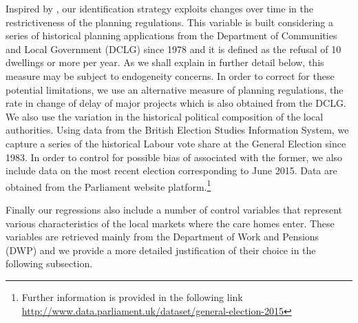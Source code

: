 \documentclass[12pt,letterpaper]{article}
\begin{document}
    Inspired by \citet{hilber2016supply}, our identification strategy exploits changes over time in the restrictiveness of the 
planning regulations. This variable is built considering a series of historical
  planning applications from the Department of Communities and Local Government (DCLG) 
  since 1978 and it is defined as the refusal of 10 dwellings or more per year. As we shall explain in further detail 
    below, this measure may be subject to endogeneity concerns. In order to correct for 
    these potential limitations, we use an alternative measure 
    of planning regulations, the rate in change of delay of major projects which is also obtained from the DCLG. We
    also use the variation in the historical 
    political composition of the local authorities. Using data from the British Election Studies Information System, 
    we capture a series of the historical Labour vote share at the General Election since 1983. 
    In order to control for possible bias of associated with the former, we 
    also include data on the most recent election corresponding to June 2015. 
    Data are obtained from the Parliament website platform.\footnote{Further information is provided  in the following link \href{http://www.data.parliament.uk/dataset/general-election-2015}{http://www.data.parliament.uk/dataset/general-election-2015}} 
    
    Finally our regressions also include a number of control variables 
    that represent various characteristics of the local markets where the care 
    homes enter. These variables are retrieved mainly from the Department of 
    Work and Pensions (DWP) and we provide a more detailed justification of 
    their choice in the following subsection.
    
\end{document}
